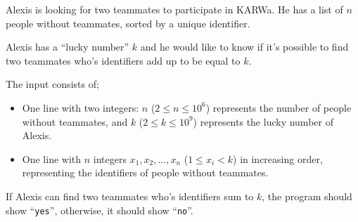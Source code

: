 \problemname{\problemyamlname}


\newcommand{\maxa}{123456789}

Alexis is looking for two teammates to participate in KARWa.
He has a list of $n$ people without teammates, sorted by a unique identifier.

Alexis has a ``lucky number'' $k$ and he would like to know if it's possible to find two teammates who's identifiers add up to be equal to $k$.

\begin{Input}
	The input consists of;
	\begin{itemize}
		\item One line with two integers: $n$ ($2 \le n \le 10^6$) represents the number of people without teammates, and $k$ ($2 \le k \le 10^9$) represents the lucky number of Alexis.
		\item One line with $n$ integers $x_1, x_2, \dots, x_n$ ($1 \le x_i < k$) in increasing order, representing the identifiers of people without teammates.
	\end{itemize}
\end{Input}

\begin{Output}
	If Alexis can find two teammates who's identifiers sum to $k$, the program should show ``\verb|yes|'', otherwise, it should show ``\verb|no|''.
\end{Output}
